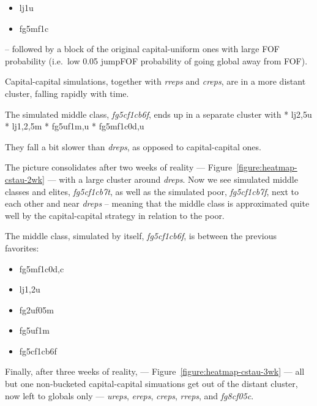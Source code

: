 \documentclass[10pt,oneside]{memoir}
\begin{document}
\begin{Spacing}{2}
\begin{itemize}


\item lj1u

\item fg5mf1c
\end{itemize}

-- followed by a block of the original capital-uniform ones with large FOF probability (i.e.\ low 0.05 jumpFOF probability of going global away from FOF).


Capital-capital simulations, together with {\itshape rreps} and {\itshape creps}, are in a more distant cluster, falling rapidly with time.


The simulated middle class, {\itshape fg5cf1cb6f}, ends up in a separate cluster with
* lj{2,5}u
* lj{1,2,5}m
* fg5uf1{m,u}
* fg5mf1{c0d,u}


They fall a bit slower than {\itshape dreps}, as opposed to capital-capital ones.


The picture consolidates after two weeks of reality --- Figure~\ref{figure:heatmap-cstau-2wk} --- with a large cluster around {\itshape dreps}.  Now we see simulated middle classes and elites, {\itshape fg5cf1cb7t}, as well as the simulated poor, {\itshape fg5cf1cb7f}, next to each other and near {\itshape dreps} -- meaning that the middle class is approximated quite well by the capital-capital strategy in relation to the poor.  


The middle class, simulated by itself, {\itshape fg5cf1cb6f}, is between the previous favorites:


\begin{itemize}


\item fg5mf{1c0d,c}

\item lj{1,2}u

\item fg2uf05m

\item fg5uf1m

\item fg5cf1cb6f
\end{itemize}

Finally, after three weeks of reality, --- Figure~\ref{figure:heatmap-cstau-3wk} --- all but one non-bucketed capital-capital simuations get out of the distant cluster, now left to globals only --- {\itshape ureps}, {\itshape ereps}, {\itshape creps}, {\itshape rreps}, and {\itshape fg8cf05c}.



\end{Spacing}
\end{document}
